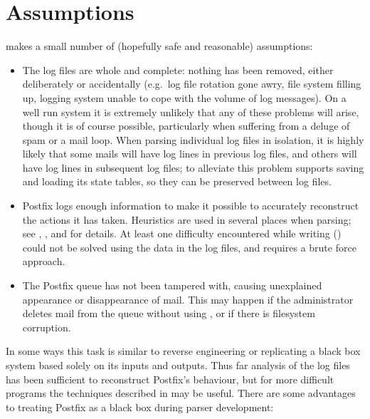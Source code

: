 \section{Assumptions}

\parsername{} makes a small number of (hopefully safe and reasonable)
assumptions:

\begin{itemize}

    \item The log files are whole and complete: nothing has been removed,
        either deliberately or accidentally (e.g.\ log file rotation gone
        awry, file system filling up, logging system unable to cope with
        the volume of log messages).  On a well run system it is extremely
        unlikely that any of these problems will arise, though it is of
        course possible, particularly when suffering from a deluge of spam
        or a mail loop.  When parsing individual log files in isolation,
        it is highly likely that some mails will have log lines in previous
        log files, and others will have log lines in subsequent log files;
        to alleviate this problem \parsername{} supports saving and loading
        its state tables, so they can be preserved between log files.

    \item Postfix logs enough information to make it possible to accurately
        reconstruct the actions it has taken.  Heuristics are used in
        several places when parsing; see , , and
         for details.  At least
        one difficulty encountered while writing \parsername{}
        () could not be
        solved using the data in the log files, and requires a brute force
        approach.

    \item The Postfix queue has not been tampered with, causing unexplained
        appearance or disappearance of mail.  This may happen if the
        administrator deletes mail from the queue without using
        , or if there is filesystem corruption.

\end{itemize}

In some ways this task is similar to reverse engineering or replicating a
black box system based solely on its inputs and outputs.  Thus far
analysis of the log files has been sufficient to reconstruct Postfix's
behaviour, but for more difficult programs the techniques described in
\cite{black-box-error-reporting} may be useful.  There are some advantages
to treating Postfix as a black box during parser development:

